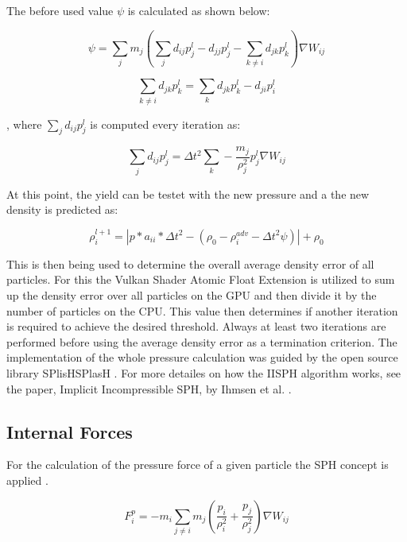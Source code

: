 \documentclass[intern]{cgMA}
\begin{document}
    The before used value $\psi$ is calculated as shown below:

    \begin{equation}
        \psi = \sum_j m_j (\sum_j d_{ij}p_j^l - d_{jj}p_j^l - \sum_{k \neq i} d_{jk}p_k^l) \nabla W_{ij}
    \end{equation}

    \begin{equation}
        \sum_{k \neq i} d_{jk}p_k^l = \sum_{k} d_{jk}p_k^l - d_{ji}p_i^l 
    \end{equation}

    , where $\sum_j d_{ij}p_j^l$ is computed every iteration as:

    \begin{equation}
        \sum_j d_{ij}p_j^l = \Delta t^2 \sum_{k} -\frac{m_j}{\rho_j^2} p_j^l \nabla W_{ij}
    \end{equation}

    At this point, the yield can be testet with the new pressure and a the new density is predicted as:

    \begin{equation}
        \rho_i^{l+1} = |p * a_{ii} * \Delta t^2 - (\rho_0 - \rho_i^{adv} - \Delta t^2 \psi)| + \rho_0
    \end{equation}

    This is then being used to determine the overall average density error of all particles. For this the Vulkan Shader Atomic Float Extension is utilized to sum up the density error over all particles on the GPU and then divide it by the number of particles on the CPU. This value then determines if another iteration is required to achieve the desired threshold. Always at least two iterations are performed before using the average density error as a termination criterion. The implementation of the whole pressure calculation was guided by the open source library SPlisHSPlasH \cite{splishsplash}. For more detailes on how the IISPH algorithm works, see the paper, Implicit Incompressible SPH, by Ihmsen et al. \cite{6570475}.

    \subsection{Internal Forces}
    
    For the calculation of the pressure force of a given particle the SPH concept is applied \cite{10.2312:PE:vriphys:vriphys12:053-060}. 

    \begin{equation}
        F_i^p = -m_i \sum_{j \neq i} m_j (\frac{p_i}{\rho_i^2} + \frac{p_j}{\rho_j^2})  \nabla W_{ij}
    \end{equation}
    
\end{document}
